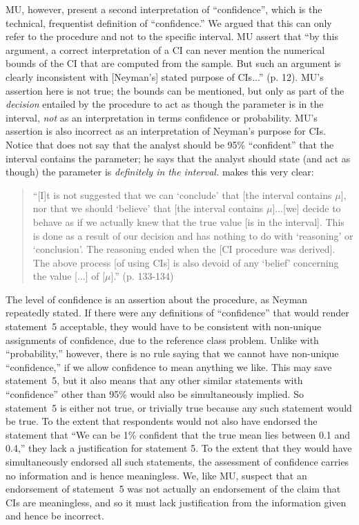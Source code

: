 \documentclass[jou,a4paper,floatsintext,draftfirst]{apa6}\usepackage[]{graphicx}\usepackage[]{color}
\begin{document}
MU, however, present a second interpretation of ``confidence'', which is the technical, frequentist definition of ``confidence.'' We argued that this can only refer to the procedure and not to the specific interval. MU assert that ``by this argument, a correct interpretation of a CI can never mention the numerical bounds of the CI that are computed from the sample. But such an argument is clearly inconsistent with [Neyman's] stated purpose of CIs...'' (p. 12). MU's assertion here is not true; the bounds can be mentioned, but only as part of the {\em decision} entailed by the procedure to act as though the parameter is in the interval, {\em not} as an interpretation in terms confidence or probability. MU's assertion is also incorrect as an interpretation of Neyman's purpose for CIs. Notice that \citet{Neyman:1937} does not say that the analyst should be 95\% ``confident'' that the interval contains the parameter; he says that the analyst should state (and act as though) the parameter is {\em definitely in the interval.} \citet{Neyman:1941} makes this very clear:

\begin{quote}
``[I]t is not suggested that we can `conclude' that [the interval contains $\mu$], nor that we should `believe' that [the interval contains $\mu$]...[we] decide to behave as if we actually knew that the true value [is in the interval]. This is done as a result of our decision and has nothing to do with `reasoning' or `conclusion'. The reasoning ended when the [CI procedure was derived]. The above process [of using CIs] is also devoid of any `belief' concerning the value [...] of [$\mu$].'' (p. 133-134)
\end{quote}

The level of confidence is an assertion about the procedure, as Neyman repeatedly stated. If there were any definitions of ``confidence'' that would render statement~5 acceptable, they would have to be consistent with non-unique assignments of confidence, due to the reference class problem. Unlike with ``probability,'' however, there is no rule saying that we cannot have non-unique ``confidence,'' if we allow confidence to mean anything we like. This may save statement~5, but it also means that any other similar statements with ``confidence'' other than 95\% would also be simultaneously implied. So statement~5 is either not true, or trivially true because any such statement would be true. To the extent that respondents would not also have endorsed the statement that ``We can be 1\% confident that the true mean lies between 0.1 and 0.4,'' they lack a justification for statement 5. To the extent that they would have simultaneously endorsed all such statements, the assessment of confidence carries no information and is hence meaningless. We, like MU, suspect that an endorsement of statement~5 was not actually an endorsement of the claim that CIs are meaningless, and so it must lack justification from the information given and hence be incorrect.
\end{document}
